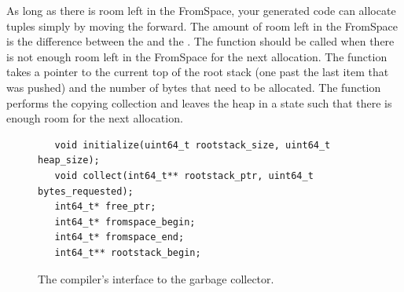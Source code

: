 \documentclass[7x10]{TimesAPriori_MIT}%
\newtheorem{exercise}[theorem]{Exercise}
\numberwithin{theorem}{chapter}
\numberwithin{definition}{chapter}
\numberwithin{equation}{chapter}
\begin{document}
As long as there is room left in the FromSpace, your generated code
can allocate tuples simply by moving the
 forward.
%
The amount of room left in the FromSpace is the difference between the
 and the .  The 
function should be called when there is not enough room left in the
FromSpace for the next allocation.  The  function takes
a pointer to the current top of the root stack (one past the last item
that was pushed) and the number of bytes that need to be
allocated. The  function performs the copying collection
and leaves the heap in a state such that there is enough room for the
next allocation.

\begin{figure}[tbp]
  \begin{tcolorbox}[colback=white]
    \begin{lstlisting}
   void initialize(uint64_t rootstack_size, uint64_t heap_size);
   void collect(int64_t** rootstack_ptr, uint64_t bytes_requested);
   int64_t* free_ptr;
   int64_t* fromspace_begin;
   int64_t* fromspace_end;
   int64_t** rootstack_begin;
\end{lstlisting}
 \end{tcolorbox}
 \caption{The compiler's interface to the garbage collector.}
\label{fig:gc-header}
\end{figure}

\end{document}
